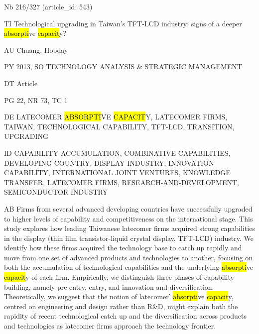 \documentclass[a4paper]{article}
\begin{document}
\vspace*{-2cm}
Nb \tabto{0cm}216/327 (article\_id: 543)\par
TI \tabto{0cm}Technological upgrading in Taiwan's TFT-LCD industry: signs of a deeper \hl{absorpti}ve \hl{capacit}y?\par
AU \tabto{0cm}Chuang, Hobday\par
PY \tabto{0cm}2013, SO TECHNOLOGY ANALYSIS \& STRATEGIC MANAGEMENT\par
DT \tabto{0cm}Article\par
PG \tabto{0cm}22, NR 73, TC 1\par
DE \tabto{0cm}LATECOMER \hl{ABSORPTI}VE \hl{CAPACIT}Y, LATECOMER FIRMS, TAIWAN, TECHNOLOGICAL CAPABILITY, TFT-LCD, TRANSITION, UPGRADING\par
ID \tabto{0cm}CAPABILITY ACCUMULATION, COMBINATIVE CAPABILITIES, DEVELOPING-COUNTRY, DISPLAY INDUSTRY, INNOVATION CAPABILITY, INTERNATIONAL JOINT VENTURES, KNOWLEDGE TRANSFER, LATECOMER FIRMS, RESEARCH-AND-DEVELOPMENT, SEMICONDUCTOR INDUSTRY\par
AB \tabto{0cm}Firms from several advanced developing countries have successfully upgraded to higher levels of capability and competitiveness on the international stage. This study explores how leading Taiwanese latecomer firms acquired strong capabilities in the display (thin film transistor-liquid crystal display, TFT-LCD) industry. We identify how these firms acquired the technology base to catch up rapidly and move from one set of advanced products and technologies to another, focusing on both the accumulation of technological capabilities and the underlying \hl{absorpti}ve \hl{capacit}y of each firm. Empirically, we distinguish three phases of capability building, namely pre-entry, entry, and innovation and diversification. Theoretically, we suggest that the notion of latecomer' \hl{absorpti}ve \hl{capacit}y, centred on engineering and design rather than R\&D, might explain both the rapidity of recent technological catch up and the diversification across products and technologies as latecomer firms approach the technology frontier.\par
\clearpage
\end{document}

